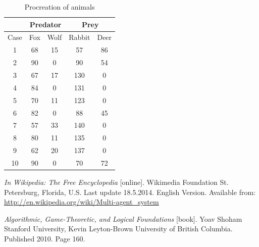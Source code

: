 \documentclass[11pt]{article}
\begin{document}
{	
	
	\begin{table}[p!]
	\centering
	\begin{tabular}{| c | c | c || c | c |}
	\hline
	&\multicolumn{2}{|c||}{Predator} & \multicolumn{2}{c|}{Prey} \\
	\hline
	Case & Fox & Wolf & Rabbit & Deer \\
	\hline
	1 & 68 & 15 & 57 & 86 \\
	\hline
	2 & 90 & 0 & 90 & 54 \\
	\hline
	3 & 67 & 17 & 130 & 0 \\
	\hline
	4 & 84 & 0 & 131 & 0 \\
	\hline
	5 & 70 & 11 & 123 & 0 \\
	\hline
	6 & 82 & 0 & 88 & 45 \\
	\hline
	7 & 57 & 33 & 140 & 0 \\
	\hline
	8 & 80 & 11 & 135 & 0 \\
	\hline
	9 & 62 & 20 & 137 & 0 \\
	\hline
	10 & 90 & 0 & 70 & 72 \\
	\hline
	\end{tabular}
	\caption{Procreation of animals}
	\label{tab:procreationTable}
	
	\end{table}
}
\newpage

\begin{thebibliography}{9}

\emph{In Wikipedia: The Free Encyclopedia} [online]. Wikimedia Foundation St. Petersburg, Florida, U.S. Last update 18.5.2014. English Version. Available from: \url{http://en.wikipedia.org/wiki/Multi-agent_system}

\emph{Algorithmic, Game-Theoretic,
and Logical Foundations} [book]. Yoav Shoham Stanford University, Kevin Leyton-Brown University of British Columbia. Published 2010. Page 160. 

\end{thebibliography}
\end{document}
